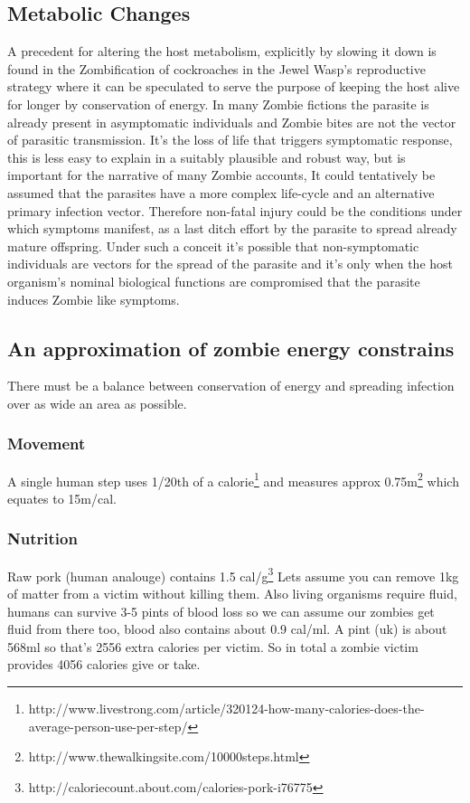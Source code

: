 \subsection{Metabolic Changes}
A precedent for altering the host metabolism, explicitly by slowing it down is found in the Zombification of cockroaches in the Jewel Wasp's reproductive strategy where it can be speculated to serve the purpose of keeping the host alive for longer by conservation of energy.
In many Zombie fictions the parasite is already present in asymptomatic individuals and Zombie bites are not the vector of parasitic transmission. It's the loss of life that triggers symptomatic response, this is less easy to explain in a suitably plausible and robust way, but is important for the narrative of many Zombie accounts, It could tentatively be assumed that the parasites have a more complex life-cycle and an alternative primary infection vector. Therefore non-fatal injury could be the conditions under which symptoms manifest, as a last ditch effort by the parasite to spread already mature offspring.
Under such a conceit it's possible that non-symptomatic individuals are vectors for the spread of the parasite and it's only when the host organism's nominal biological functions are compromised that the parasite induces Zombie like symptoms.

\subsection{An approximation of zombie energy constrains}
There must be a balance between conservation of energy and spreading infection over as wide an area as possible.
\subsubsection{Movement}
A single human step uses 1/20th of a calorie\footnote{http://www.livestrong.com/article/320124-how-many-calories-does-the-average-person-use-per-step/} and measures approx 0.75m\footnote{http://www.thewalkingsite.com/10000steps.html} 
which equates to 15m/cal.
\subsubsection{Nutrition}
Raw pork (human analouge) contains 1.5 cal/g\footnote{http://caloriecount.about.com/calories-pork-i76775}
Lets assume you can remove 1kg of matter from a victim without killing them.
Also living organisms require fluid, humans can survive 3-5 pints of blood loss so we can assume our zombies get fluid from there too, blood also contains about 0.9 cal/ml.
A pint (uk) is about 568ml so that's 2556 extra calories per victim.
So in total a zombie victim provides 4056 calories give or take.
